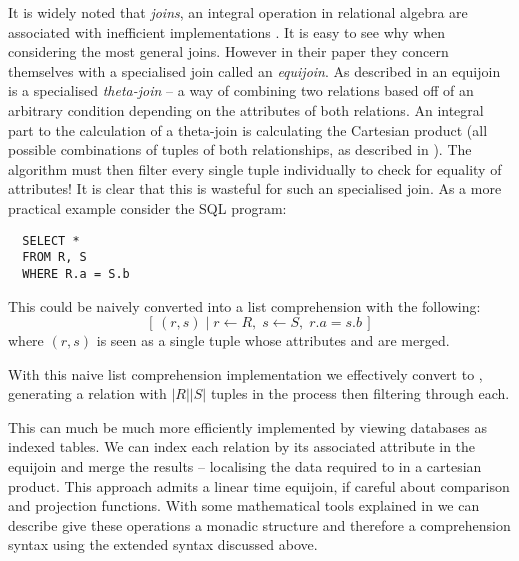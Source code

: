 It is widely noted that \emph{joins}, an integral operation in relational algebra are associated with inefficient implementations \cite{JoinProcessing}. It is easy to see why when considering the most general joins. However in their paper \cite{RelationalAlgebraByWayOfAdjunctions} they concern themselves with a specialised join called an \emph{equijoin}. As described in  an equijoin is a specialised \emph{theta-join} -- a way of combining two relations based off of an arbitrary condition depending on the attributes of both relations. An integral part to the calculation of a theta-join is calculating the Cartesian product (all possible combinations of tuples of both relationships, as described in ). The algorithm must then filter every single tuple individually to check for equality of attributes! It is clear that this is wasteful for such an specialised join. As a more practical example consider the SQL program:
\begin{lstlisting}
  SELECT *
  FROM R, S
  WHERE R.a = S.b
\end{lstlisting}
This could be naively converted into a list comprehension with the following:
\[
  \left[\,(r, s)\;|\;r \leftarrow R,\;s \leftarrow S,\;r.a = s.b\,\right]
\]
where $(r, s)$ is seen as a single tuple whose attributes  and  are merged. 

 With this naive list comprehension implementation we effectively convert  to , generating a relation with $|R||S|$ tuples in the process then filtering through each.

 This can much be much more efficiently implemented by viewing databases as indexed tables. We can index each relation by its associated attribute in the equijoin and merge the results -- localising the data required to in a cartesian product. This approach admits a linear time equijoin, if careful about comparison and projection functions. \cite{RelationalAlgebraByWayOfAdjunctions} With some mathematical tools explained in  we can describe give these operations a monadic structure and therefore a comprehension syntax using the extended syntax discussed above.

